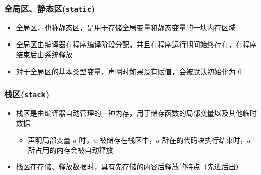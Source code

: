 \begin{frame}[fragile]
    \frametitle{全局区、静态区(\lstinline|static|)}
    
    \begin{itemize}  
        \item 全局区，也称静态区，是用于存储全局变量和静态变量的一块内存区域
        \item 全局区由编译器在程序编译阶段分配，并且在程序运行期间始终存在，在程序结束后由系统释放
        \item 对于全局区的基本类型变量，声明时如果没有赋值，会被默认初始化为 0
    \end{itemize}

\end{frame}

\begin{frame}[fragile]
    \frametitle{栈区(\lstinline|stack|)}
    
    \begin{itemize}
        \item 栈区是由编译器自动管理的一种内存，用于储存函数的局部变量以及其他临时数据
        \begin{itemize}
            \item 声明局部变量 $a$ 时，$a$ 被储存在栈区中，$a$ 所在的代码块执行结束时，$a$ 所占用的内存会被自动释放
        \end{itemize}
        \item 栈区在存储、释放数据时，具有先存储的内容后释放的特点（先进后出）
    \end{itemize}

\end{frame}

